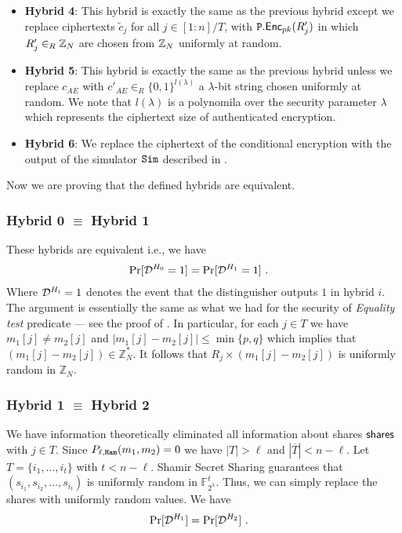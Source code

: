 \begin{proofof}{}
\begin{itemize}
       \item \textbf{Hybrid 4}: This hybrid is exactly the same as the previous hybrid except we replace ciphertexts $ \tilde{c}_{j}$ for all $ j\in [1:n]/ T  $, with ${\mathtt{P}}.{\mathsf{Enc}}_{pk}(R'_j)$ in which $ R'_j\in_R \mathbb{Z}_N $ are chosen from $\mathbb{Z}_{N}$ uniformly at random.
           
	 	\item \textbf{Hybrid 5}: This hybrid is exactly the same as the previous hybrid unless we replace $ c_{AE} $ with $ c'_{AE} \in_R \{0,1\}^{l(\lambda)}$ a $\lambda$-bit string chosen uniformly at random. We note that $l(\lambda)$ is a polynomila over the security parameter $\lambda$ which represents the ciphertext size of authenticated encryption. 
	 
	 	\item \textbf{Hybrid 6}: We replace the ciphertext of the conditional encryption with the output of the simulator $ {\mathtt{Sim}} $ described in .
	 	
	 	
	 	\end{itemize}
 	
 	
	Now we are proving that the defined hybrids are equivalent. 


\subsubsection{\textbf{Hybrid 0} $\equiv$ \textbf{Hybrid 1} } These hybrids are  equivalent i.e., we have 
	\begin{align}
& \Pr[{\mathcal{D}}^{H_{0}} =1] = \Pr[{\mathcal{D}}^{H_1} =1] \ . 
\end{align} 
Where ${\mathcal{D}}^{H_i}=1$ denotes the event that the distinguisher outputs $1$ in hybrid $i$. 
The argument is essentially the same as what we had for the security of \textit{Equality test} predicate --- see the proof of . In particular, for each $j \in T$ we have $m_1[j] \neq m_2[j]$ and $\left|m_1\left[j\right]-m_2\left[j\right]\right| \leq \min\{p,q\}$ which implies that $\left(m_1\left[j\right]-m_2\left[j\right]\right) \in \mathbb{Z}_N^*$. It follows that $R_j \times \left(m_1\left[j\right]-m_2\left[j\right]\right)$ is uniformly random in $\mathbb{Z}_N$.  


\subsubsection{\textbf{Hybrid 1} $ \equiv $ \textbf{Hybrid 2}} We have information theoretically eliminated all information about shares ${\mathsf{shares}}{}$ with $j \in T$. Since $P_{\ell,{\mathtt{Ham}}}(m_1,m_2)=0$ we have $|T| > \ell$ and $|\overline{T}| < n-\ell$. Let $T=\{i_1,\ldots, i_t\}$ with $t < n-\ell$. Shamir Secret Sharing guarantees that $(s_{i_1} , s_{i_2} , \ldots , s_{i_t})$ is uniformly random in $\mathbb{F}_{2^{\lambda}}^t$. Thus, we can simply replace the shares with uniformly random values. We have \begin{align}
& \Pr[{\mathcal{D}}^{H_{1}} ] =   \Pr[{\mathcal{D}}^{H_2} ] \ . 
\end{align} 




\end{proofof}
